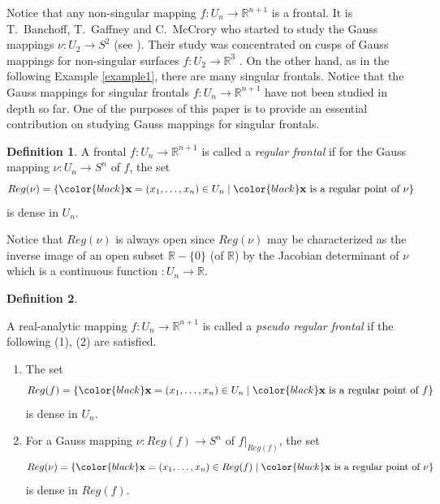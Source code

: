\documentclass{amsart}
\theoremstyle{definition}
\newtheorem{definition}{Definition}
\theoremstyle{definition}
\theoremstyle{definition}
\newcommand{\ch}[1]{{\color{black} #1}}
\begin{document}
\par 
\smallskip 
Notice that any non-singular mapping 
$f: U_n\to \mathbb{R}^{n+1}$ is 
a frontal.     
It is T.~Banchoff, T.~Gaffney and C.~McCrory who started to study 
the Gauss mappings $\nu: U_2\to S^2$ (see \cite{cusps}).    
Their study was concentrated on cusps of Gauss  mappings 
for non-singular surfaces 
{\color{black}
$f: U_2\to \mathbb{R}^3$
}.   
On the other hand,  as in the following Example \ref{example1}, 
there are many singular frontals.      
Notice that the Gauss mappings for singular frontals 
$f: U_n\to \mathbb{R}^{n+1}$ have not been studied in depth {\color{black}so far}.     
One of the purposes of this paper is to 
provide an essential contribution on studying Gauss mappings 
for singular frontals.       
\begin{definition}\label{regular frontal}
A frontal $f: U_n\to \mathbb{R}^{n+1}$ is called 
a \textit{regular frontal} if for
the Gauss mapping $\nu:U_n\to S^n$ of $f$, the set 
\[ 
Reg(\nu)=\left\{{\color{black}\bf x}=\left(x_1, \ldots, x_n\right)\in U_n \; |\; 
{\color{black}\bf x} \mbox{ is a regular point of }\nu\right\}
\] 
is %
dense in $U_n$.   
\end{definition} 
 
Notice that $Reg(\nu)$ is always open since 
$Reg(\nu)$ may be characterized as the inverse image of an open subset 
$\mathbb{R}-\{0\}$ (of $\mathbb{R}$) by the Jacobian determinant of $\nu$ which 
is a continuous function $: U_n\to \mathbb{R}$.   

\begin{definition}\label{pseudo regular frontal}
{\rm 
A {\color{black}real-analytic} mapping $f: U_n\to \mathbb{R}^{n+1}$ is called 
a \textit{pseudo regular frontal} if the following (1), (2) are satisfied.   
\begin{enumerate}
\item[(1)] The set 
\[
Reg(f)=\left\{{\color{black}\bf x}=\left(x_1, \ldots, x_n\right)\in U_n\; |\; 
{\color{black}\bf x} \mbox{ is a regular point of }f\right\}
\]
is %
dense in $U_n$.   
\item[(2)] For {\color{black}a} Gauss mapping $\nu: Reg(f)\to S^n$ 
of {\color{black}$f|_{Reg(f)}$}, the set 
\[ 
Reg(\nu)=\left\{{\color{black}\bf x}=\left(x_1, \ldots, x_n\right)\in Reg(f) \; |\; 
{\color{black}\bf x} \mbox{ is a regular point of }\nu\right\}
\] 
is %
dense in $Reg(f)$.   
\end{enumerate}
}
\end{definition} 
\end{document}

